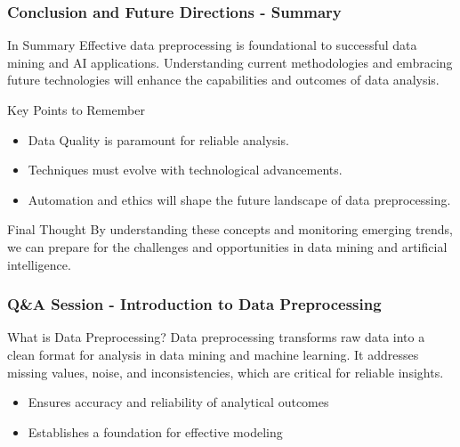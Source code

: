 \documentclass[aspectratio=169]{beamer}
\begin{document}
\begin{frame}[fragile]
    \frametitle{Conclusion and Future Directions - Summary}
    \begin{block}{In Summary}
        Effective data preprocessing is foundational to successful data mining and AI applications. Understanding current methodologies and embracing future technologies will enhance the capabilities and outcomes of data analysis.
    \end{block}

    \begin{block}{Key Points to Remember}
        \begin{itemize}
            \item Data Quality is paramount for reliable analysis.
            \item Techniques must evolve with technological advancements.
            \item Automation and ethics will shape the future landscape of data preprocessing.
        \end{itemize}
    \end{block}

    \begin{block}{Final Thought}
        By understanding these concepts and monitoring emerging trends, we can prepare for the challenges and opportunities in data mining and artificial intelligence.
    \end{block}
\end{frame}

\begin{frame}[fragile]
    \frametitle{Q\&A Session - Introduction to Data Preprocessing}
    \begin{block}{What is Data Preprocessing?}
        Data preprocessing transforms raw data into a clean format for analysis in data mining and machine learning. It addresses missing values, noise, and inconsistencies, which are critical for reliable insights.
    \end{block}
    
    \begin{itemize}
        \item Ensures accuracy and reliability of analytical outcomes
        \item Establishes a foundation for effective modeling
    \end{itemize}
\end{frame}
\end{document}
